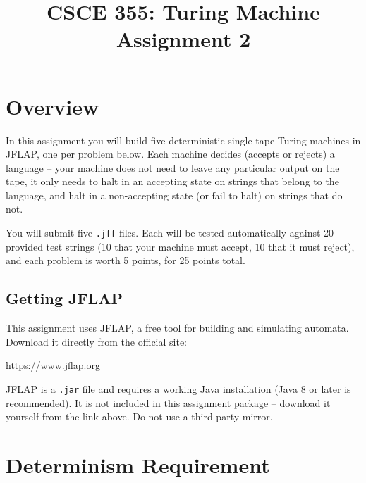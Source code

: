 \documentclass[11pt]{article}
\title{CSCE 355: Turing Machine Assignment 2}
\author{}
\date{}
\begin{document}
\maketitle


\section*{Overview}

In this assignment you will build five deterministic single-tape Turing
machines in JFLAP, one per problem below. Each machine decides (accepts or
rejects) a language -- your machine does not need to leave any particular
output on the tape, it only needs to halt in an accepting state on strings
that belong to the language, and halt in a non-accepting state (or fail to
halt) on strings that do not.

You will submit five \texttt{.jff} files. Each will be tested automatically
against 20 provided test strings (10 that your machine must accept, 10 that
it must reject), and each problem is worth 5 points, for 25 points total.

\subsection*{Getting JFLAP}

This assignment uses JFLAP, a free tool for building and simulating
automata. Download it directly from the official site:

\begin{center}
\url{https://www.jflap.org}
\end{center}

JFLAP is a \texttt{.jar} file and requires a working Java installation
(Java 8 or later is recommended). It is not included in this assignment
package -- download it yourself from the link above. Do not use a
third-party mirror.

\section*{Determinism Requirement}
\end{document}
